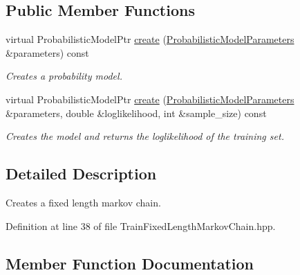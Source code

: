 \subsection*{Public Member Functions}
\begin{DoxyCompactItemize}
\item 
virtual Probabilistic\+Model\+Ptr \hyperlink{classtops_1_1TrainFixedLengthMarkovChain_a13c61bbbe042026a4e406f5ba9214b0e}{create} (\hyperlink{classtops_1_1ProbabilisticModelParameters}{Probabilistic\+Model\+Parameters} \&parameters) const
\begin{DoxyCompactList}\small\item\em Creates a probability model. \end{DoxyCompactList}\item 
\mbox{\label{classtops_1_1TrainFixedLengthMarkovChain_a69c2692580c3447db27a0e2cb4f02260}} 
virtual Probabilistic\+Model\+Ptr \hyperlink{classtops_1_1TrainFixedLengthMarkovChain_a69c2692580c3447db27a0e2cb4f02260}{create} (\hyperlink{classtops_1_1ProbabilisticModelParameters}{Probabilistic\+Model\+Parameters} \&parameters, double \&loglikelihood, int \&sample\+\_\+size) const
\begin{DoxyCompactList}\small\item\em Creates the model and returns the loglikelihood of the training set. \end{DoxyCompactList}\end{DoxyCompactItemize}


\subsection{Detailed Description}
Creates a fixed length markov chain. 

Definition at line 38 of file Train\+Fixed\+Length\+Markov\+Chain.\+hpp.



\subsection{Member Function Documentation}
\mbox{\label{classtops_1_1TrainFixedLengthMarkovChain_a13c61bbbe042026a4e406f5ba9214b0e}} 

